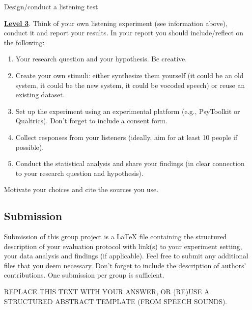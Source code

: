 \documentclass{../labbook}
\begin{document}
\begin{problem}{1}{10}{Design/conduct a listening test}
\smallskip

\noindent \underline{\textbf{Level 3}}. Think of your own listening experiment (see information above), conduct it and report your results. In your report you should include/reflect on the following:
\begin{enumerate}
    \item Your research question and your hypothesis. Be creative.
    \item Create your own stimuli: either synthesize them yourself (it could be an old system, it could be the new system, it could be vocoded speech) or reuse an existing dataset. 
    \item Set up the experiment using an experimental platform (e.g., PsyToolkit or Qualtrics). Don't forget to include a consent form.
    \item Collect responses from your listeners (ideally, aim for at least 10 people if possible).
    \item Conduct the statistical analysis and share your findings (in clear connection to your research question and hypothesis).
\end{enumerate}

Motivate your choices and cite the sources you use.

\subsection*{Submission}
\noindent Submission of this group project is a LaTeX file containing the structured description of your evaluation protocol with link(s) to your experiment setting, your data analysis and findings (if applicable). Feel free to submit any additional files that you deem necessary. Don't forget to include the description of authors' contributions. One submission per group is sufficient.
\end{problem}

\begin{solution}
REPLACE THIS TEXT WITH YOUR ANSWER, OR (RE)USE A STRUCTURED ABSTRACT TEMPLATE (FROM SPEECH SOUNDS).
\end{solution}
\end{document}
